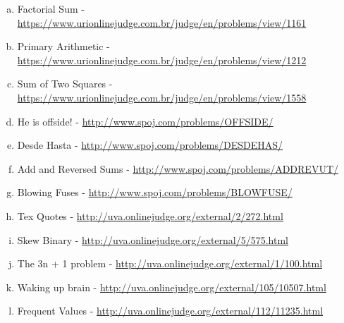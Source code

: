 \begin{enumerate}[1 -]
	
	\begin{enumerate}[a)]
		\item Factorial Sum - \href{https://www.urionlinejudge.com.br/judge/en/problems/view/1161} {https://www.urionlinejudge.com.br/judge/en/problems/view/1161}	
		\item Primary Arithmetic - \href{https://www.urionlinejudge.com.br/judge/en/problems/view/1212} {https://www.urionlinejudge.com.br/judge/en/problems/view/1212}			
		\item Sum of Two Squares - \href{https://www.urionlinejudge.com.br/judge/en/problems/view/1558} {https://www.urionlinejudge.com.br/judge/en/problems/view/1558}
		\item He is offside! - \href{http://www.spoj.com/problems/OFFSIDE/}{http://www.spoj.com/problems/OFFSIDE/}
		\item Desde Hasta - \href{http://www.spoj.com/problems/DESDEHAS/}{http://www.spoj.com/problems/DESDEHAS/}
		\item Add and Reversed Sums - \href{http://www.spoj.com/problems/ADDREVUT/}{http://www.spoj.com/problems/ADDREVUT/} 
		\item Blowing Fuses - \href{http://www.spoj.com/problems/BLOWFUSE/}{http://www.spoj.com/problems/BLOWFUSE/} 
		\item Tex Quotes - \href{http://uva.onlinejudge.org/external/2/272.html}{http://uva.onlinejudge.org/external/2/272.html} 
		\item Skew Binary - \href{http://uva.onlinejudge.org/external/5/575.html}{http://uva.onlinejudge.org/external/5/575.html}
		\item The 3n + 1 problem - \href{http://uva.onlinejudge.org/external/1/100.html}{http://uva.onlinejudge.org/external/1/100.html} 	
\item Waking up brain - \href{http://uva.onlinejudge.org/external/105/10507.html}{http://uva.onlinejudge.org/external/105/10507.html} 
\item Frequent Values - \href{http://uva.onlinejudge.org/external/112/11235.html}{http://uva.onlinejudge.org/external/112/11235.html} 
		
	
	\end{enumerate}
	

\end{enumerate}

